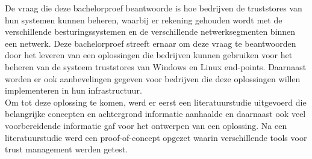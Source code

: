 De vraag die deze bachelorproef beantwoorde is hoe bedrijven de truststores van hun systemen kunnen beheren, waarbij er rekening gehouden wordt met de verschillende besturingssystemen en de verschillende netwerksegmenten binnen een netwerk.
Deze bachelorproef streeft ernaar om deze vraag te beantwoorden door het leveren van een oplossingen die bedrijven kunnen gebruiken voor het beheren van de systeem truststores van Windows en Linux end-points.
Daarnaast worden er ook aanbevelingen gegeven voor bedrijven die deze oplossingen willen implementeren in hun infrastructuur. \\

Om tot deze oplossing te komen, werd er eerst een literatuurstudie uitgevoerd die belangrijke concepten en achtergrond informatie aanhaalde en daarnaast ook veel voorbereidende informatie gaf voor het ontwerpen van een oplossing.
Na een literatuurstudie werd een proof-of-concept opgezet waarin verschillende tools voor trust management werden getest.

